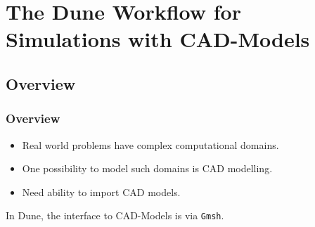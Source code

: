 \section{The Dune Workflow for Simulations with CAD-Models}\label{Sec:Workflow}

\subsection{Overview}

\begin{frame}
  \frametitle<presentation>{Overview}
  \begin{itemize}
    \item Real world problems have complex computational domains.
    \item One possibility to model such domains is CAD modelling.
    \item Need ability to import CAD models.
  \end{itemize}
  In Dune, the interface to CAD-Models is via \lstinline!Gmsh!.
\end{frame}

